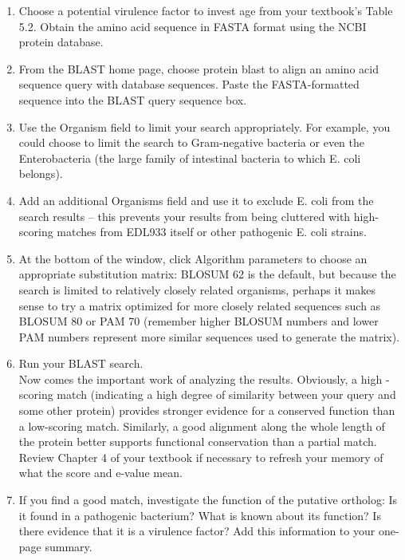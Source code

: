 \begin{enumerate}
	\item Choose a potential virulence factor to invest age from your textbook's Table 5.2.  Obtain the amino acid sequence in FASTA format using the NCBI protein database.

	\item From the BLAST home page, choose protein blast to align an amino acid sequence query with database sequences.  Paste the FASTA-formatted sequence into the BLAST query sequence box.

	\item  Use the Organism field to limit your search appropriately.  For example, you could choose to limit the search to Gram-negative bacteria or even the Enterobacteria (the large family of intestinal bacteria to which E. coli belongs).

	\item Add an additional Organisms field and use it to exclude E. coli from the search results – this prevents your results from being cluttered with high-scoring matches from EDL933 itself or other pathogenic E. coli strains.
	
	\item  At the bottom of the window, click Algorithm parameters to choose an appropriate substitution matrix: BLOSUM 62 is the default, but because the search is limited to relatively closely related organisms, perhaps it makes sense to try a matrix optimized for more closely related sequences such as BLOSUM 80 or PAM 70 (remember higher BLOSUM numbers and lower PAM numbers represent more similar sequences used to generate the matrix).

	\item Run your BLAST search. \\

Now comes the important work of analyzing the results. Obviously, a high -scoring match (indicating a high degree of similarity between your query and some other protein) provides stronger evidence for a conserved function than a low-scoring match.  Similarly, a good alignment along the whole length of the protein better supports functional conservation than a partial match.  Review Chapter 4 of your textbook if necessary to refresh your memory of what the score and e-value mean.  

	\item  If you find a good match, investigate the function of the putative ortholog: Is it found in a pathogenic bacterium?  What is known about its function?  Is there evidence that it is a virulence factor?  Add this information to your one-page summary.
	

\end{enumerate}
